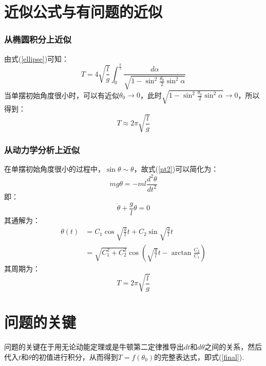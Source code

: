 \documentclass{jams-l}
\theoremstyle{definition}
\theoremstyle{remark}
\numberwithin{equation}{section}
\begin{document}
\part{近似公式与有问题的近似}
\section{从椭圆积分上近似}
由式(\ref{ellipse})可知：
\begin{equation}
    T=4\sqrt{\frac{l}{g}}\int^{\frac{\pi}{2}}_0 \frac{d\alpha}{\sqrt{1-\sin^2\frac{\theta_0}{2}\sin^2\alpha}}
\end{equation}
当单摆初始角度很小时，可以有近似$\theta_0 \to 0$，此时$\sqrt{1-\sin^2\frac{\theta_0}{2}\sin^2\alpha}\to 0$，所以得到：
\begin{equation}
    T\approx 2\pi \sqrt{\frac{l}{g}}
\end{equation}


\section{从动力学分析上近似}
在单摆初始角度很小的过程中，$\sin \theta \sim \theta $，故式(\ref{nt2})可以简化为：
\begin{equation}
    mg\theta=-ml\frac{d^2\theta}{dt^2}
\end{equation}
即：
\begin{equation}
    \ddot{\theta}+\frac{g}{l}\theta=0
\end{equation}
其通解为：
\begin{equation}
\begin{aligned}
    \theta(t)
    &= C_1\cos \sqrt{\frac{g}{l}}t+C_2\sin \sqrt{\frac{g}{l}}t \\
    &= \sqrt{C_1^2+C_2^2} \cos (\sqrt{\frac{g}{l}} t-\arctan \frac{C_2}{C_1})
\end{aligned}
\end{equation}
其周期为：
\begin{equation}
    T= 2\pi \sqrt{\frac{l}{g}}
\end{equation}







\part{问题的关键}
问题的关键在于用无论动能定理或是牛顿第二定律推导出$dt$和$d\theta$之间的关系，然后代入$t$和$\theta$的初值进行积分，从而得到$T=f(\theta_0)$的完整表达式，即式(\ref{final}).
\end{document}

